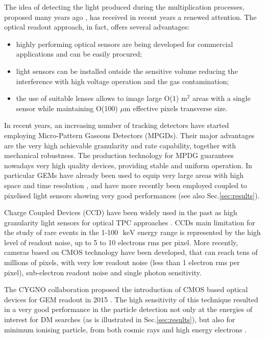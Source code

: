 \documentclass[physics,article,submit,moreauthors,pdftex]{Definitions/mdpi}
\newcommand{\keV}{\ensuremath{\,\textrm{keV}}\xspace}
\begin{document}
The idea of detecting the light produced during the multiplication processes, proposed many years ago \cite{bib:charpak}, has received in recent years a renewed attention. The optical readout approach, in fact, offers several advantages:
\begin{itemize}
\item highly performing optical sensors are being developed for commercial applications and can be easily procured;
\item light sensors can be installed outside the sensitive volume reducing the interference with high voltage operation and the gas contamination;
\item the use of suitable lenses allows to image large O(1) m$^2$ areas with a single sensor while maintaining O(100) $\mu$m effective pixels transverse size.
\end{itemize}

In recent years, an increasing number of tracking detectors have started employing 
Micro-Pattern Gaseous Detectors (MPGDs). Their major advantages are the very high achievable granularity and rate capability, together with mechanical robustness. The production technology for MPDG guarantees nowadays very high quality devices, providing stable and uniform operation. In particular GEMs \cite{bib:gem} have already been used to equip very large areas with high space and time resolution \cite{bib:alice}, and have more recently been employed coupled to pixelised light sensors showing very good performances \cite{bib:ref1, bib:jinst_orange1, bib:loomba, bib:Fraga} (see also Sec.\ref{sec:results}). 

Charge Coupled Devices (CCD) have been widely used in the past as high granularity light sensors for optical TPC approaches \citep{bib:ccd1, bib:loomba, bib:ccd2}. CCDs main limitation for the study of rare events in the 1-100~\keV energy range is represented by the high level of readout noise, up to 5 to 10 electrons rms per pixel. More recently, cameras based on CMOS technology have been developed, that can reach tens of millions of pixels, with very low readout noise (less than 1 electron rms per pixel), sub-electron readout noise and single photon sensitivity. 

The CYGNO collaboration proposed the introduction of CMOS based optical devices for GEM readout in 2015  \cite{bib:nim_orange1}. The high sensitivity of this technique resulted in a very good performance in the particle detection not only at the energies of interest for DM searches (as is illustrated in Sec.\ref{sec:results}), but also for minimum ionising particle, from both cosmic rays and high energy electrons  \cite{ bib:jinst_orange1, bib:jinst_orange2, bib:ieee_orange, bib:elba, bib:lemon_btf}. 
\end{document}
